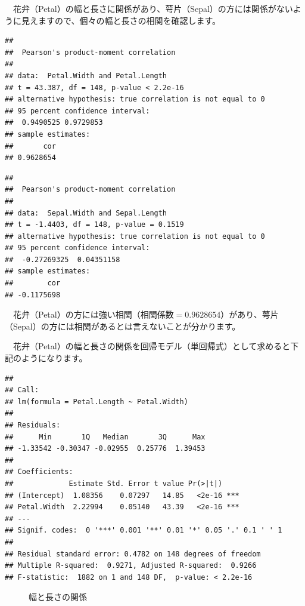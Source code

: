\documentclass[
  12pt,
]{book}
\begin{document}
　花弁（Petal）の幅と長さに関係があり、萼片（Sepal）の方には関係がないように見えますので、個々の幅と長さの相関を確認します。

\begin{verbatim}
## 
##  Pearson's product-moment correlation
## 
## data:  Petal.Width and Petal.Length
## t = 43.387, df = 148, p-value < 2.2e-16
## alternative hypothesis: true correlation is not equal to 0
## 95 percent confidence interval:
##  0.9490525 0.9729853
## sample estimates:
##       cor 
## 0.9628654
\end{verbatim}

\begin{verbatim}
## 
##  Pearson's product-moment correlation
## 
## data:  Sepal.Width and Sepal.Length
## t = -1.4403, df = 148, p-value = 0.1519
## alternative hypothesis: true correlation is not equal to 0
## 95 percent confidence interval:
##  -0.27269325  0.04351158
## sample estimates:
##        cor 
## -0.1175698
\end{verbatim}

　花弁（Petal）の方には強い相関（相関係数\(=0.9628654\)）があり、萼片（Sepal）の方には相関があるとは言えないことが分かります。

　花弁（Petal）の幅と長さの関係を回帰モデル（単回帰式）として求めると下記のようになります。

\begin{verbatim}
## 
## Call:
## lm(formula = Petal.Length ~ Petal.Width)
## 
## Residuals:
##      Min       1Q   Median       3Q      Max 
## -1.33542 -0.30347 -0.02955  0.25776  1.39453 
## 
## Coefficients:
##             Estimate Std. Error t value Pr(>|t|)    
## (Intercept)  1.08356    0.07297   14.85   <2e-16 ***
## Petal.Width  2.22994    0.05140   43.39   <2e-16 ***
## ---
## Signif. codes:  0 '***' 0.001 '**' 0.01 '*' 0.05 '.' 0.1 ' ' 1
## 
## Residual standard error: 0.4782 on 148 degrees of freedom
## Multiple R-squared:  0.9271, Adjusted R-squared:  0.9266 
## F-statistic:  1882 on 1 and 148 DF,  p-value: < 2.2e-16
\end{verbatim}

\begin{figure}[H]

{\centering {}

}

\caption{幅と長さの関係}\label{fig:unnamed-chunk-8}
\end{figure}
\end{document}
